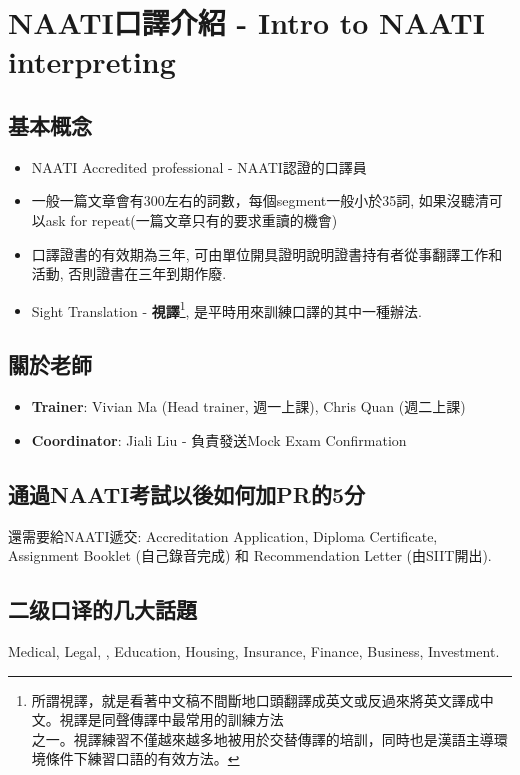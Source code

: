\chapter{NAATI口譯介紹 - Intro to NAATI interpreting}
\section{基本概念}
\begin{itemize}
  \itemsep0em
  \item NAATI Accredited professional - NAATI認證的口譯員
  \item 一般一篇文章會有300左右的詞數，每個segment一般小於35詞, 如果沒聽清可以ask for repeat(一篇文章只有的要求重讀的機會)
  \item 口譯證書的有效期為三年, 可由單位開具證明說明證書持有者從事翻譯工作和活動, 否則證書在三年到期作廢.
  \item Sight Translation - \textbf{視譯}\footnote{所謂視譯，就是看著中文稿不間斷地口頭翻譯成英文或反過來將英文譯成中文。視譯是同聲傳譯中最常用的訓練方法 \\ 之一。視譯練習不僅越來越多地被用於交替傳譯的培訓，同時也是漢語主導環境條件下練習口語的有效方法。}, 是平時用來訓練口譯的其中一種辦法.
\end{itemize}

\section{關於老師}
\begin{itemize}
  \itemsep0em
  \item \textbf{Trainer}: Vivian Ma (Head trainer, 週一上課), Chris Quan (週二上課)
  \item \textbf{Coordinator}: Jiali Liu - 負責發送Mock Exam Confirmation
\end{itemize}

\section{通過NAATI考試以後如何加PR的5分}
還需要給NAATI遞交: Accreditation Application, Diploma Certificate, Assignment Booklet (自己錄音完成) 和 Recommendation Letter (由SIIT開出).

\section{二级口译的几大話題}
Medical, Legal, , Education, Housing, Insurance, Finance, Business, Investment.

